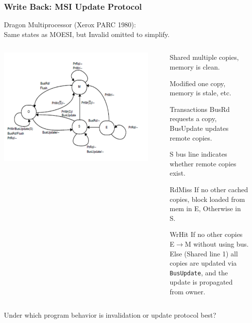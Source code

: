 \documentclass{beamer}
\newcommand{\emp}[1]{\textcolor{DikuRed}{ #1}}
\begin{document}
\begin{frame}[fragile,t]
\frametitle{Write Back: MSI Update Protocol}

Dragon Multiprocessor (Xerox PARC 1980):\\
Same states as MOESI, but Invalid omitted to simplify.

\begin{columns}\hspace{-7ex}
\includegraphics[width=40ex]{FigsInfCoherence/MSIupdate}\pause
{}
\begin{scriptsize}
\begin{itemize}
    \item[Shared] multiple copies, memory is clean. 
    \item[Modified] one copy, memory is stale, etc.
    \item[Transactions] BusRd requests a copy, BusUpdate updates remote copies.
    \item[S bus line] indicates whether remote copies exist.\bigskip
    \item[RdMiss] If no other cached copies, block loaded from mem in E,
                   Otherwise in S.\\
    \item[WrHit] If no other copies E$\rightarrow$M without using bus.\\
                 \emp{Else (Shared line 1) all copies are updated via 
                    {\tt BusUpdate}, and the update is propagated from owner.}  
\end{itemize}
\end{scriptsize}
\end{columns}
\bigskip
Under which program behavior is invalidation or update protocol best?

\end{frame}
\end{document}
